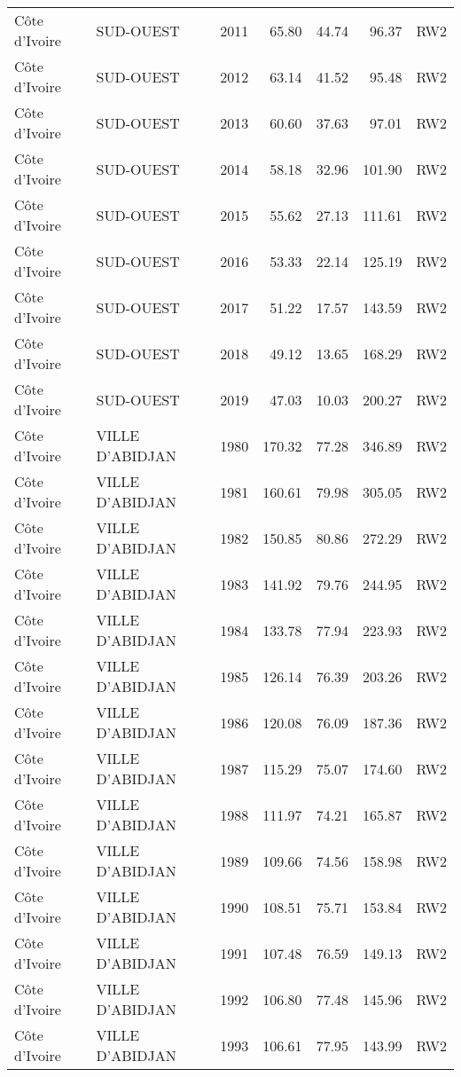 \begin{longtable}{lllrrrl}
  C\^{o}te d'Ivoire & SUD-OUEST & 2011 & 65.80 & 44.74 & 96.37 & RW2 \\ 
  C\^{o}te d'Ivoire & SUD-OUEST & 2012 & 63.14 & 41.52 & 95.48 & RW2 \\ 
  C\^{o}te d'Ivoire & SUD-OUEST & 2013 & 60.60 & 37.63 & 97.01 & RW2 \\ 
  C\^{o}te d'Ivoire & SUD-OUEST & 2014 & 58.18 & 32.96 & 101.90 & RW2 \\ 
  C\^{o}te d'Ivoire & SUD-OUEST & 2015 & 55.62 & 27.13 & 111.61 & RW2 \\ 
  C\^{o}te d'Ivoire & SUD-OUEST & 2016 & 53.33 & 22.14 & 125.19 & RW2 \\ 
  C\^{o}te d'Ivoire & SUD-OUEST & 2017 & 51.22 & 17.57 & 143.59 & RW2 \\ 
  C\^{o}te d'Ivoire & SUD-OUEST & 2018 & 49.12 & 13.65 & 168.29 & RW2 \\ 
  C\^{o}te d'Ivoire & SUD-OUEST & 2019 & 47.03 & 10.03 & 200.27 & RW2 \\ 
  C\^{o}te d'Ivoire & VILLE D'ABIDJAN & 1980 & 170.32 & 77.28 & 346.89 & RW2 \\ 
  C\^{o}te d'Ivoire & VILLE D'ABIDJAN & 1981 & 160.61 & 79.98 & 305.05 & RW2 \\ 
  C\^{o}te d'Ivoire & VILLE D'ABIDJAN & 1982 & 150.85 & 80.86 & 272.29 & RW2 \\ 
  C\^{o}te d'Ivoire & VILLE D'ABIDJAN & 1983 & 141.92 & 79.76 & 244.95 & RW2 \\ 
  C\^{o}te d'Ivoire & VILLE D'ABIDJAN & 1984 & 133.78 & 77.94 & 223.93 & RW2 \\ 
  C\^{o}te d'Ivoire & VILLE D'ABIDJAN & 1985 & 126.14 & 76.39 & 203.26 & RW2 \\ 
  C\^{o}te d'Ivoire & VILLE D'ABIDJAN & 1986 & 120.08 & 76.09 & 187.36 & RW2 \\ 
  C\^{o}te d'Ivoire & VILLE D'ABIDJAN & 1987 & 115.29 & 75.07 & 174.60 & RW2 \\ 
  C\^{o}te d'Ivoire & VILLE D'ABIDJAN & 1988 & 111.97 & 74.21 & 165.87 & RW2 \\ 
  C\^{o}te d'Ivoire & VILLE D'ABIDJAN & 1989 & 109.66 & 74.56 & 158.98 & RW2 \\ 
  C\^{o}te d'Ivoire & VILLE D'ABIDJAN & 1990 & 108.51 & 75.71 & 153.84 & RW2 \\ 
  C\^{o}te d'Ivoire & VILLE D'ABIDJAN & 1991 & 107.48 & 76.59 & 149.13 & RW2 \\ 
  C\^{o}te d'Ivoire & VILLE D'ABIDJAN & 1992 & 106.80 & 77.48 & 145.96 & RW2 \\ 
  C\^{o}te d'Ivoire & VILLE D'ABIDJAN & 1993 & 106.61 & 77.95 & 143.99 & RW2 \\ 

\end{longtable}

